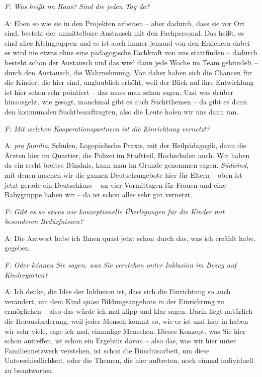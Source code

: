 \begin{linenumbers*}
\emph{F: Was heißt im Haus? Sind die jeden Tag da?}

A: Eben so wie sie in den Projekten arbeiten -- aber dadurch, dass sie vor Ort sind, besteht der unmittelbare Austausch mit den Fachpersonal. Das heißt, es sind alles Kleingruppen und es ist auch immer jemand von den Erziehern dabei -- es wird nie etwas ohne eine pädagogische Fachkraft von uns stattfinden -- dadurch besteht schon der Austausch und das wird dann jede Woche im Team gebündelt -- durch den Austausch, die Wahrnehmung. Von daher haben sich die Chancen für die Kinder, die hier sind, unglaublich erhöht, weil der Blick auf ihre Entwicklung ist hier schon sehr pointiert -- das muss man schon sagen. Und was drüber hinausgeht, wie gesagt, manchmal gibt es auch Suchtthemen -- da gibt es dann den kommunalen Suchtbeauftragten, also die Leute holen wir uns dann ran. 

\emph{F: Mit welchen Kooperationspartnern ist die Einrichtung vernetzt?}

A: \emph{pro familia}, Schulen, Logopädische Praxis, mit der Heilpädagogik, dann die Ärzten hier im Quartier, die Polizei im Stadtteil, Hochschulen auch. Wir haben da ein recht breites Bündnis, kann man im Grunde genommen sagen. \emph{Südwind}, mit denen machen wir die ganzen Deutschangebote hier für Eltern -- oben ist jetzt gerade ein Deutschkurs -- an vier Vormittagen für Frauen und eine Babygruppe haben wir -- da ist schon alles sehr gut vernetzt. 

\emph{F: Gibt es so etwas wie konzeptionelle Überlegungen für die Kinder mit besonderen Bedürfnissen?}

A: Die Antwort habe ich Ihnen quasi jetzt schon durch das, was ich erzählt habe, gegeben.

\emph{F: Oder können Sie sagen, was Sie verstehen unter Inklusion im Bezug auf Kindergarten?}

A: Ich denke, die Idee der Inklusion ist, dass sich die Einrichtung so auch verändert, um dem Kind quasi Bildungsangebote in der Einrichtung zu ermöglichen -- also das würde ich mal klipp und klar sagen. Darin liegt natürlich die Herausforderung, weil jeder Mensch kommt so, wie er ist und hier in haben wir sehr viele, sage ich mal, einmalige Menschen. Dieses Konzept, was Sie hier schon antreffen, ist schon ein Ergebnis davon -- also das, was wir hier unter Familiennetzwerk verstehen, ist schon die Bündnisarbeit, um diese Unterschiedlichkeit, oder die Themen, die hier auftreten, noch einmal individuell zu beantworten. 


\end{linenumbers*}
